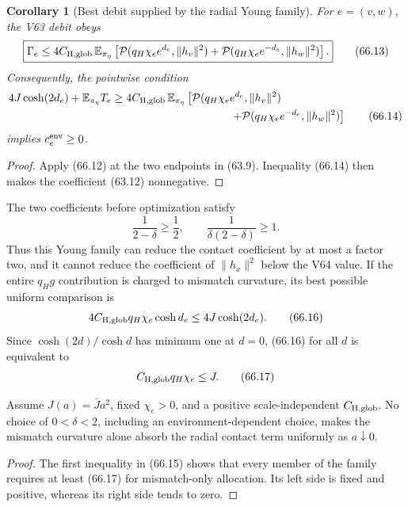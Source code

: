 \documentclass[11pt]{article}
\newtheorem{corollary}[theorem]{Corollary}
\theoremstyle{remark}
\begin{document}
\begin{corollary}[Best debit supplied by the radial Young family]
\label{cor:v17v66-debit}
For \(e=(v,w)\), the V63 debit obeys
\[
\boxed{
 \Gamma_e
 \leq4C_{\rm H,glob}\,
 \mathbb E_{\pi_\eta}\left[
 \mathcal P(q_H\chi_e e^{d_e},\|h_v\|^2)
 +\mathcal P(q_H\chi_e e^{-d_e},\|h_w\|^2)
 \right].}                                       \tag{66.13}
\]
Consequently, the pointwise condition
\[
\begin{aligned}
 4J\cosh(2d_e)+\mathbb E_{\pi_\eta}T_e
 \geq{}&4C_{\rm H,glob}\,
 \mathbb E_{\pi_\eta}\left[
 \mathcal P(q_H\chi_e e^{d_e},\|h_v\|^2)\right.\\
 &\left.\hspace{33mm}
 +\mathcal P(q_H\chi_e e^{-d_e},\|h_w\|^2)
 \right]
                                                        \tag{66.14}
\end{aligned}
\]
implies \(c_e^{\rm env}\geq0\).
\end{corollary}

\begin{proof}
Apply (66.12) at the two endpoints in (63.9).  Inequality (66.14)
then makes the coefficient (63.12) nonnegative.
\end{proof}

The two coefficients before optimization satisfy
\[
 \frac1{2-\delta}\geq\frac12,
 \qquad
 \frac1{\delta(2-\delta)}\geq1.                  \tag{66.15}
\]
Thus this Young family can reduce the contact coefficient by at most a
factor two, and it cannot reduce the coefficient of \(\|h_x\|^2\)
below the V64 value.  If the entire \(q_Hg\) contribution is charged
to mismatch curvature, its best possible uniform comparison is
\[
 4C_{\rm H,glob}q_H\chi_e\cosh d_e
 \leq4J\cosh(2d_e).                               \tag{66.16}
\]
Since \(\cosh(2d)/\cosh d\) has minimum one at \(d=0\), (66.16) for
all \(d\) is equivalent to
\[
 C_{\rm H,glob}q_H\chi_e\leq J.                  \tag{66.17}
\]

\begin{countertheorem}
\label{ctr:v17v66-scale}
Assume \(J(a)=\bar Ja^2\), fixed \(\chi_e>0\), and a positive
scale-independent \(C_{\rm H,glob}\).  No choice of
\(0<\delta<2\), including an environment-dependent choice, makes the
mismatch curvature alone absorb the radial contact term uniformly as
\(a\downarrow0\).
\end{countertheorem}

\begin{proof}
The first inequality in (66.15) shows that every member of the family
requires at least (66.17) for mismatch-only allocation.  Its left side
is fixed and positive, whereas its right side tends to zero.
\end{proof}
\end{document}
